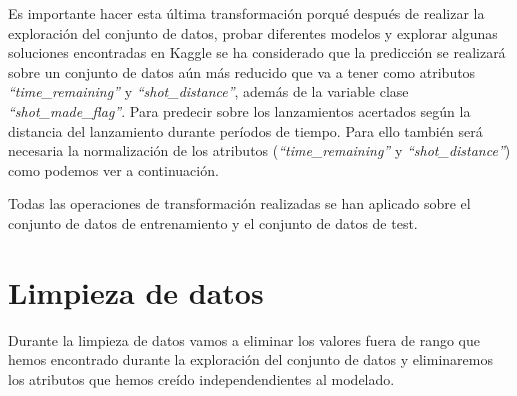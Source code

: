 \documentclass[
]{article}
\newenvironment{Shaded}{\begin{snugshade}}{\end{snugshade}}
\newcommand{\ControlFlowTok}[1]{\textcolor[rgb]{0.13,0.29,0.53}{\textbf{#1}}}
\newcommand{\KeywordTok}[1]{\textcolor[rgb]{0.13,0.29,0.53}{\textbf{#1}}}
\newcommand{\NormalTok}[1]{#1}
\newcommand{\OperatorTok}[1]{\textcolor[rgb]{0.81,0.36,0.00}{\textbf{#1}}}
\newcommand{\StringTok}[1]{\textcolor[rgb]{0.31,0.60,0.02}{#1}}
\begin{document}
Es importante hacer esta última transformación porqué después de
realizar la exploración del conjunto de datos, probar diferentes modelos
y explorar algunas soluciones encontradas en Kaggle se ha considerado
que la predicción se realizará sobre un conjunto de datos aún más
reducido que va a tener como atributos \emph{``time\_remaining''} y
\emph{``shot\_distance''}, además de la variable clase
\emph{``shot\_made\_flag''}. Para predecir sobre los lanzamientos
acertados según la distancia del lanzamiento durante períodos de tiempo.
Para ello también será necesaria la normalización de los atributos
(\emph{``time\_remaining''} y \emph{``shot\_distance''}) como podemos
ver a continuación.

\begin{Shaded}
\end{Shaded}

Todas las operaciones de transformación realizadas se han aplicado sobre
el conjunto de datos de entrenamiento y el conjunto de datos de test.

\hypertarget{limpieza-de-datos}{%
\section{\texorpdfstring{\textbf{Limpieza de
datos}}{Limpieza de datos}}\label{limpieza-de-datos}}

Durante la limpieza de datos vamos a eliminar los valores fuera de rango
que hemos encontrado durante la exploración del conjunto de datos y
eliminaremos los atributos que hemos creído independendientes al
modelado.
\end{document}
